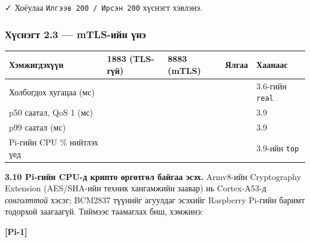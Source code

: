 \begin{Shaded}
\begin{Highlighting}[]
 \KeywordTok{\textbackslash{}}
    \KeywordTok{|} 
 \KeywordTok{\textbackslash{}}
    \KeywordTok{\textbackslash{}}
    \KeywordTok{|} 
\end{Highlighting}
\end{Shaded}

✓ Хоёулаа \texttt{Илгээв\ 200\ /\allowbreak{}\ Ирсэн\ 200} хүснэгт хэвлэнэ.

\hypertarget{ux445ux4afux441ux43dux44dux433ux442-2.3-mtls-ux438ux439ux43d-ux4afux43dux44d}{%
\subsubsection{Хүснэгт 2.3 --- mTLS-ийн үнэ}\label{ux445ux4afux441ux43dux44dux433ux442-2.3-mtls-ux438ux439ux43d-ux4afux43dux44d}}

\begingroup\scriptsize\begin{longtable}[]{@{}lllll@{}}
\toprule
Хэмжигдэхүүн & 1883 (TLS-гүй) & 8883 (mTLS) & Ялгаа & Хаанаас\tabularnewline
\midrule
\endhead
Холбогдох хугацаа (мс) & & & & 3.6-гийн \texttt{real}\tabularnewline
p50 саатал, QoS 1 (мс) & & & & 3.9\tabularnewline
p99 саатал (мс) & & & & 3.9\tabularnewline
Pi-гийн CPU \% нийтлэх үед & & & & 3.9-ийн \texttt{top}\tabularnewline
\bottomrule
\end{longtable}\endgroup

\textbf{3.10 Pi-гийн CPU-д крипто өргөтгөл байгаа эсэх.} Armv8-ийн Cryptography Extension (AES/SHA-ийн техник хангамжийн заавар) нь Cortex-A53-д \emph{сонголттой} хэсэг; BCM2837 түүнийг агуулдаг эсэхийг Raspberry Pi-гийн баримт тодорхой заагаагүй. Тиймээс таамаглах биш, хэмжинэ:

\textbf{{[}Pi-1{]}}

